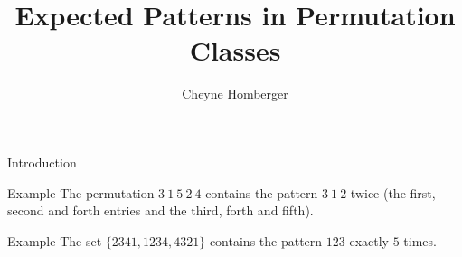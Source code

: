 \documentclass{beamer}
\begin{document}
\begin{frame}
  \title{Expected Patterns in Permutation Classes}
  \author{Cheyne Homberger}
  \maketitle
\end{frame}


\begin{frame}{Introduction}
  \pause 

  \begin{block}{Example}
    The permutation $3 \ 1 \ 5 \ 2 \ 4$ contains the
    pattern $3 \ 1 \ 2$ twice (the first, second and forth entries and
    the third, forth and fifth).
  \end{block}
  \pause

  \begin{block}{Example}
    The set $\{ 2341 , 1234, 4321 \} $ contains the pattern $123$
    exactly $5$ times. 
  \end{block}
\end{frame}
\end{document}
